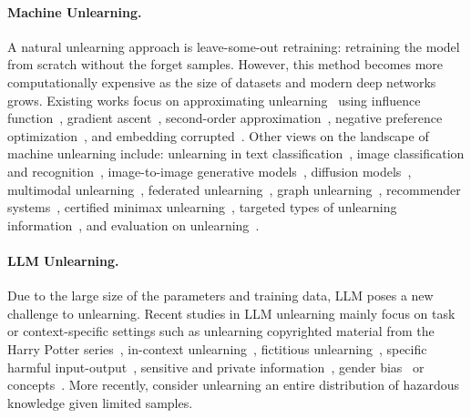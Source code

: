 \documentclass[letterpaper]{article} %
\begin{document}
\paragraph{Machine Unlearning.}  
A natural unlearning approach is leave-some-out retraining: retraining the model from scratch without the forget samples. However, this method becomes more computationally expensive as the size of datasets and modern deep networks grows. Existing works focus on approximating unlearning~\cite{warnecke2021machine, izzo2021approximate, sekhari2021remember, isonuma2024unlearning} using influence function~\cite{koh2017understanding, grosse2023studying}, gradient ascent~\cite{thudi2022unrolling}, second-order approximation~\cite{jia2024soul}, negative preference optimization~\cite{zhang2024negative}, and embedding corrupted~\cite{liu2024large}. Other views on the landscape of machine unlearning include: unlearning in text classification~\cite{ma2022learn}, image classification and recognition~\cite{ginart2019making, golatkar2020eternal, fan2024salun, choi2023towards, cha2024learning}, image-to-image generative models~\cite{li2024machine}, diffusion models~\cite{gandikota2023erasing, zhang2024forget, kumari2023ablating,bui2024adversarial}, multimodal unlearning~\cite{cheng2023multimodal}, federated unlearning~\cite{romandini2024federated, 10.1145/3485447.3512222, 10.5555/3618408.3618577, halimi2022federated, jeong2024sok}, graph unlearning~\cite{chen2022graph, chien2023efficient, 10.1145/3580305.3599271, cheng2023gnndelete, dukler2023safe, zhu2023heterogeneous, li2024towards, tan2024unlink}, recommender systems~\cite{zhang2023recommendation, chen2024post, li2023making, wang2025towards}, certified minimax unlearning~\cite{liu2024certified}, targeted types of unlearning information~\cite{cooper2024machine}, and evaluation on unlearning~\cite{lynch2024eight, hayes2024inexact, shi2024detecting, shi2024muse}.
\paragraph{LLM Unlearning.} Due to the large size of the parameters and training data, LLM poses a new challenge to unlearning. Recent studies in LLM unlearning mainly focus on task or context-specific settings such as unlearning copyrighted material from the Harry Potter series~\cite{eldan2023s}, in-context unlearning~\cite{pawelczykcontext}, fictitious unlearning~\cite{maini2024tofu}, specific harmful input-output~\cite{llmu, liu2024towards}, sensitive and private information~\cite{jang-etal-2023-knowledge, wu-etal-2023-depn, patil2024can}, gender bias~\cite{belrose2023leace} or concepts~\cite{hong2024intrinsic, bui2024adversarial}. More recently, \citet{wmdp} consider unlearning an entire distribution of hazardous knowledge given limited samples.
\end{document}
